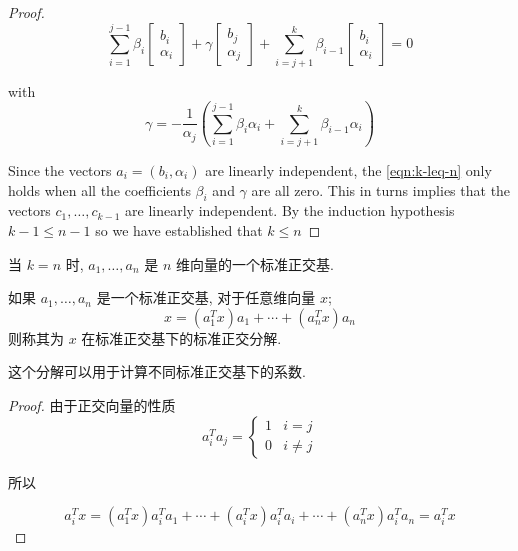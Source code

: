 \begin{proof}
    \begin{equation}
        \label{eqn:k-leq-n}
        \sum_{i=1}^{j-1} \beta_{i}\left[\begin{array}{c}
        b_{i} \\
        \alpha_{i}
        \end{array}\right]+\gamma\left[\begin{array}{c}
        b_{j} \\
        \alpha_{j}
        \end{array}\right]+\sum_{i=j+1}^{k} \beta_{i-1}\left[\begin{array}{c}
        b_{i} \\
        \alpha_{i}
        \end{array}\right]=0
    \end{equation}

    with
    $$
    \gamma=-\frac{1}{\alpha_{j}}\left(\sum_{i=1}^{j-1} \beta_{i} \alpha_{i}+\sum_{i=j+1}^{k} \beta_{i-1} \alpha_{i}\right)
    $$

    Since the vectors $ a_{i}=\left(b_{i}, \alpha_{i}\right) $ are linearly independent, the \cref{eqn:k-leq-n} only holds when all the coefficients $ \beta_{i} $ and $ \gamma $ are all zero. This in turns implies that the vectors $ c_{1}, \ldots, c_{k-1} $ are linearly independent. By the induction hypothesis $ k-1 \leq n-1 $ so we have established that $ k \leq n $
\end{proof}

\begin{definition}[$n$维向量的一个标准正交基]
    当 $ k=n $ 时,  $ a_{1}, \ldots, a_{n} $ 是 $ n $ 维向量的一个标准正交基. 
\end{definition}

\begin{definition}[ $ x $ 在标准正交基下的标准正交分解]
    如果 $ a_{1}, \ldots, a_{n} $ 是一个标准正交基, 对于任意维向量 $ x $;
$$
x=\left(a_{1}^{T} x\right) a_{1}+\cdots+\left(a_{n}^{T} x\right) a_{n}
$$
则称其为 $ x $ 在标准正交基下的标准正交分解. 
\end{definition}

    这个分解可以用于计算不同标准正交基下的系数. 

\begin{proof}
    由于正交向量的性质
    $$ a_{i}^{T} a_{j}=\left\{\begin{array}{ll}1 & i=j \\ 0 & i \neq j\end{array}\right. $$

    所以

    $$ a_{i}^{T} x=\left(a_{1}^{T} x\right) a_{i}^{T} a_{1}+\cdots+\left(a_{i}^{T} x\right) a_{i}^{T} a_{i}+\cdots+\left(a_{n}^{T} x\right) a_{i}^{T} a_{n}=a_{i}^{T} x $$
\end{proof}

